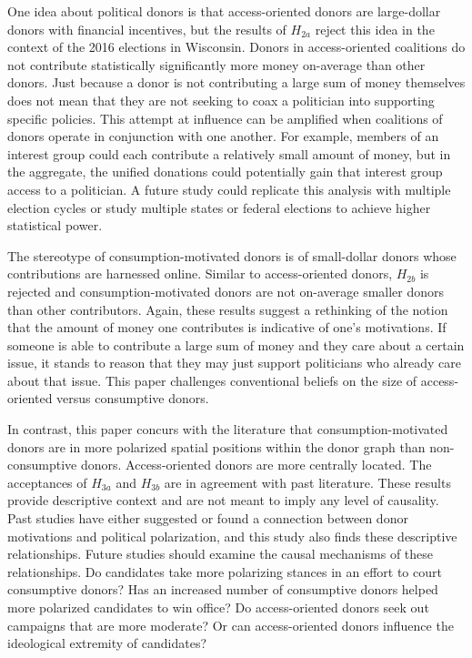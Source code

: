 \documentclass[12pt,]{article}
\begin{document}
One idea about political donors is that access-oriented donors are
large-dollar donors with financial incentives, but the results of
\(H_{2a}\) reject this idea in the context of the 2016 elections in
Wisconsin. Donors in access-oriented coalitions do not contribute
statistically significantly more money on-average than other donors.
Just because a donor is not contributing a large sum of money themselves
does not mean that they are not seeking to coax a politician into
supporting specific policies. This attempt at influence can be amplified
when coalitions of donors operate in conjunction with one another. For
example, members of an interest group could each contribute a relatively
small amount of money, but in the aggregate, the unified donations could
potentially gain that interest group access to a politician. A future
study could replicate this analysis with multiple election cycles or
study multiple states or federal elections to achieve higher statistical
power.

The stereotype of consumption-motivated donors is of small-dollar donors
whose contributions are harnessed online. Similar to access-oriented
donors, \(H_{2b}\) is rejected and consumption-motivated donors are not
on-average smaller donors than other contributors. Again, these results
suggest a rethinking of the notion that the amount of money one
contributes is indicative of one's motivations. If someone is able to
contribute a large sum of money and they care about a certain issue, it
stands to reason that they may just support politicians who already care
about that issue. This paper challenges conventional beliefs on the size
of access-oriented versus consumptive donors.

In contrast, this paper concurs with the literature that
consumption-motivated donors are in more polarized spatial positions
within the donor graph than non-consumptive donors. Access-oriented
donors are more centrally located. The acceptances of \(H_{3a}\) and
\(H_{3b}\) are in agreement with past literature. These results provide
descriptive context and are not meant to imply any level of causality.
Past studies have either suggested or found a connection between donor
motivations and political polarization, and this study also finds these
descriptive relationships. Future studies should examine the causal
mechanisms of these relationships. Do candidates take more polarizing
stances in an effort to court consumptive donors? Has an increased
number of consumptive donors helped more polarized candidates to win
office? Do access-oriented donors seek out campaigns that are more
moderate? Or can access-oriented donors influence the ideological
extremity of candidates?
\end{document}

